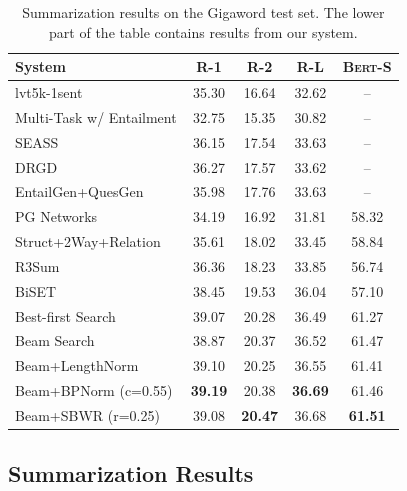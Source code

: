 \documentclass[letterpaper]{article} %
\begin{document}
\begin{table}[t]
\setlength{\tabcolsep}{5.5pt}
\renewcommand{\arraystretch}{1.08}
\centering
\begin{small}
\begin{tabular}{|l|ccc|c|}
\hline
\textbf{System} & \textbf{R-1} & \textbf{R-2} & \textbf{R-L} & \textsc{Bert-S}\\
\hline
lvt5k-1sent& 35.30 & {16.64} & 32.62 & -- \\
Multi-Task w/ Entailment & 32.75 & {15.35} & 30.82 & -- \\
SEASS & 36.15 & 17.54 & 33.63 & -- \\
DRGD & 36.27 & 17.57 & 33.62 & -- \\
EntailGen+QuesGen & 35.98 & 17.76 & 33.63 & -- \\
PG Networks & 34.19 & 16.92 & 31.81 & 58.32 \\
Struct+2Way+Relation & 35.61 & 18.02 & 33.45 & 58.84 \\
R3Sum & 36.36 & 18.23 & 33.85 & 56.74 \\
BiSET & 38.45 & 19.53 & 36.04 & 57.10 \\
\hline
\hline
Best-first Search & 39.07 & 20.28 & 36.49 & 61.27\\
Beam Search & 38.87 & 20.37 & 36.52 & 61.47 \\
Beam+LengthNorm &39.10 & 20.25 & 36.55 & 61.41\\
Beam+BPNorm (c=0.55) & \textbf{39.19} & 20.38 & \textbf{36.69} & 61.46 \\
Beam+SBWR (r=0.25) & 39.08 & \textbf{20.47} & 36.68 & \textbf{61.51} \\
\hline
\end{tabular}
\end{small}
\caption{Summarization results on the Gigaword test set.
The lower part of the table contains results from our system.}
\label{tab:results_gigaword}
\end{table}


\subsection{Summarization Results}
\label{sec:results}
\end{document}
